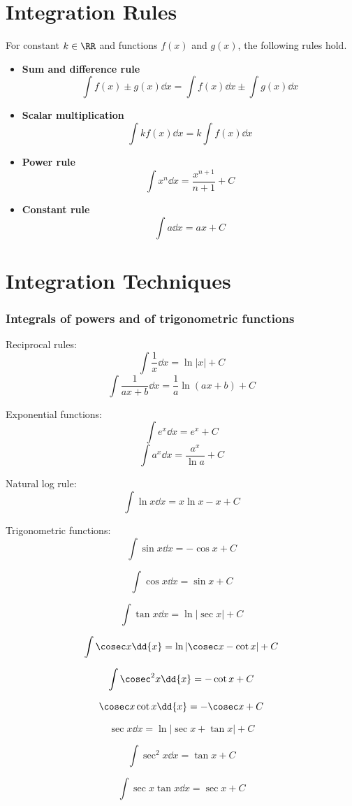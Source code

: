 \section{Integration Rules}
For constant $k\in\RR$ and functions $f(x)$ and $g(x)$, the following rules hold.
\begin{itemize}
\item \textbf{Sum and difference rule}
\[ \int f(x)\pm g(x) \dd{x} = \int f(x) \dd{x} \pm \int g(x) \dd{x} \]

\item \textbf{Scalar multiplication}
\[ \int kf(x) \dd{x} = k\int f(x) \dd{x} \]

\item \textbf{Power rule}
\[ \int x^n \dd{x} = \frac{x^{n+1}}{n+1} + C \]

\item \textbf{Constant rule}
\[ \int a\dd{x} = ax + C \]
\end{itemize}

\section{Integration Techniques}
\subsubsection{Integrals of powers and of trigonometric functions}
Reciprocal rules:
\[ \int \frac{1}{x} \dd{x} = \ln|x| + C \]
\[ \int \frac{1}{ax+b} \dd{x} = \frac{1}{a} \ln(ax+b) + C \]

Exponential functions:
\[ \int e^x \dd{x} = e^x + C \]
\[ \int a^{x} \dd{x} = \frac{a^x}{\ln a} + C \]

Natural log rule:
\[ \int \ln x \dd{x} = x\ln x - x + C \]

Trigonometric functions:
\[ \int \sin x \dd{x} = -\cos x + C \]

\[ \int \cos x \dd{x} = \sin x + C \]

\[ \int \tan x \dd{x} = \ln|\sec x| + C \]

\[ \int \cosec x \dd{x} = \ln|\cosec x - \cot x| + C \]

\[ \int \cosec^2x \dd{x} = -\cot x + C \]

\[ \cosec x \cot x \dd{x} = -\cosec x + C \]

\[ \sec x \dd{x} = \ln|\sec x + \tan x| + C \]

\[ \int \sec^2 x \dd{x} = \tan x + C \]

\[ \int \sec x \tan x \dd{x} = \sec x + C \]

